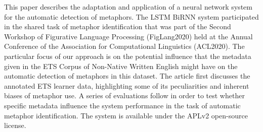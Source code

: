 This paper describes the adaptation and application of a neural network system for the automatic detection of metaphors. The  LSTM BiRNN system participated in the shared task of metaphor identification that was part of the Second Workshop of Figurative Language Processing (FigLang2020) held at the Annual Conference of the Association for Computational Linguistics (ACL2020). The particular focus of our approach is on the potential influence that the metadata given in the ETS Corpus of Non-Native Written English might have on the automatic detection of metaphors in this dataset. The article first discusses the annotated ETS learner data, highlighting some of its peculiarities and inherent biases of metaphor use. A series of evaluations follow in order to test whether specific metadata influence the system performance in the task of automatic metaphor identification. The system is available under the APLv2 open-source license.
